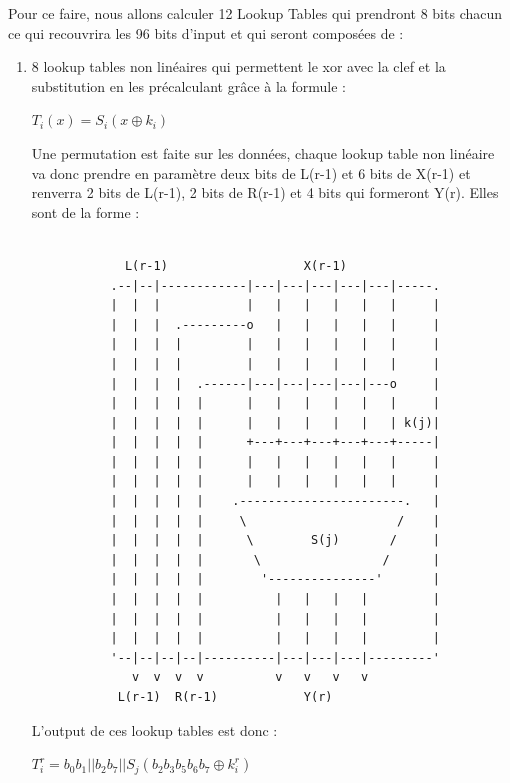 \documentclass[a4paper,12pt]{article}
\begin{document}
				
Pour ce faire, nous allons calculer 12 Lookup Tables qui prendront 8 bits chacun ce qui recouvrira les 96 bits d'input et qui seront composées de :
\bigskip
\begin{enumerate}
\item 8 lookup tables non linéaires qui permettent le xor avec la clef et la substitution en les précalculant grâce à la formule :

\medskip
\begin{center}
$T_i(x) = S_i(x \oplus k_i)$ 
\end{center}
\medskip

Une permutation est faite sur les données, chaque lookup table non linéaire va donc prendre en paramètre deux bits de L(r-1) et 6 bits de X(r-1) et renverra 2 bits de L(r-1), 2 bits de R(r-1) et 4 bits qui formeront Y(r). Elles sont de la forme :

\begin{Verbatim}[samepage=true]

             L(r-1)                   X(r-1)
           .--|--|------------|---|---|---|---|---|-----.
           |  |  |            |   |   |   |   |   |     |
           |  |  |  .---------o   |   |   |   |   |     |
           |  |  |  |         |   |   |   |   |   |     |   
           |  |  |  |         |   |   |   |   |   |     |  
           |  |  |  |  .------|---|---|---|---|---o     | 
           |  |  |  |  |      |   |   |   |   |   |     | 
           |  |  |  |  |      |   |   |   |   |   | k(j)|  
           |  |  |  |  |      +---+---+---+---+---+-----|  
           |  |  |  |  |      |   |   |   |   |   |     | 
           |  |  |  |  |      |   |   |   |   |   |     | 
           |  |  |  |  |    .-----------------------.   |              
           |  |  |  |  |     \                     /    |              
           |  |  |  |  |      \        S(j)       /     |              
           |  |  |  |  |       \                 /      |               
           |  |  |  |  |        '---------------'       |               
           |  |  |  |  |          |   |   |   |         |     
           |  |  |  |  |          |   |   |   |         | 
           |  |  |  |  |          |   |   |   |         |   
           '--|--|--|--|----------|---|---|---|---------'
              v  v  v  v          v   v   v   v 
            L(r-1)  R(r-1)            Y(r)

\end{Verbatim}	


L'output de ces lookup tables est donc :
\medskip
\begin{center}
$T_i^r = b_0 b_1||b_2 b_7||S_j(b_2 b_3 b_5 b_6 b_7 \oplus k_i^r)$ 
\end{center}
\medskip


\end{enumerate}
\end{document}
